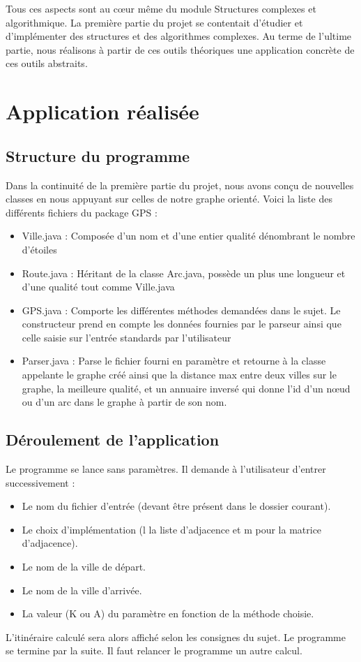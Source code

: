Tous ces aspects sont au cœur même du module Structures complexes et algorithmique. La première partie du projet se contentait d'étudier et d'implémenter des structures et des algorithmes complexes. Au terme de l'ultime partie, nous réalisons à partir de ces outils  théoriques une application concrète de ces outils abstraits.

\clearpage

\section{Application réalisée}

\subsection{Structure du programme}
Dans la continuité de la première partie du projet, nous avons conçu de nouvelles classes en nous appuyant sur celles de notre graphe orienté. Voici la liste des différents fichiers du package GPS : 

\begin{itemize}
\item
Ville.java : Composée d'un nom et d'une entier qualité dénombrant le nombre d'étoiles
\item
Route.java : Héritant de la classe Arc.java, possède un plus une longueur  et d'une qualité tout comme Ville.java
\item
GPS.java : Comporte les différentes méthodes demandées dans le sujet. Le constructeur prend en compte les données fournies par le parseur ainsi que celle saisie sur l'entrée standards par l'utilisateur
\item
Parser.java : Parse le fichier fourni en paramètre et retourne à la classe appelante le graphe créé ainsi que la distance max entre deux villes sur le graphe, la meilleure qualité, et un annuaire inversé qui donne l'id d'un nœud ou d'un arc dans le graphe à partir de son nom.
\end{itemize}


\subsection{Déroulement de l'application}
Le programme se lance sans paramètres. Il demande à l'utilisateur d'entrer successivement : 
\begin{itemize}
\item
Le nom du fichier d'entrée (devant être présent dans le dossier courant).
\item
Le choix d'implémentation (l la liste d'adjacence et m pour la matrice d'adjacence).
\item
Le nom de la ville de départ.
\item
Le nom de la ville d'arrivée.
\item 
La valeur (K ou A) du paramètre en fonction de la méthode choisie.
\end{itemize}
L'itinéraire calculé sera alors affiché selon les consignes du sujet. Le programme se termine par la suite. Il faut relancer le programme un autre calcul.
 

